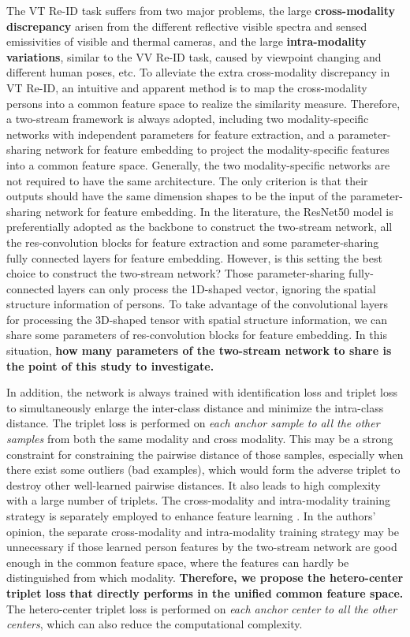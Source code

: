\documentclass[journal]{IEEEtran}
\begin{document}
The VT Re-ID task suffers from two major problems, the large \textbf{cross-modality discrepancy} arisen from the different reflective visible spectra and sensed emissivities of visible and thermal cameras, and the large \textbf{intra-modality variations}, similar to the VV Re-ID task, caused by viewpoint changing and different human poses, etc.
To alleviate the extra cross-modality discrepancy in VT Re-ID, an intuitive and apparent method is to map the cross-modality persons into a common feature space to realize the similarity measure. Therefore, a two-stream framework is always adopted, including two modality-specific networks with independent parameters for feature extraction, and a parameter-sharing network for feature embedding to project the modality-specific features into a common feature space.
Generally, the two modality-specific networks are not required to have the same architecture. The only criterion is that their outputs should have the same dimension shapes to be the input of the parameter-sharing network for feature embedding.
In the literature, the ResNet50 \cite{he2016deep} model is preferentially adopted as the backbone to construct the two-stream network, all the res-convolution blocks for feature extraction and some parameter-sharing fully connected layers for feature embedding. However, is this setting the best choice to construct the two-stream network? Those parameter-sharing fully-connected layers can only process the 1D-shaped vector, ignoring the spatial structure information of persons. To take advantage of the convolutional layers for processing the 3D-shaped tensor with spatial structure information, we can share some parameters of res-convolution blocks for feature embedding. In this situation, \textbf{how many parameters of the two-stream network to share is the point of this study to investigate.}

In addition, the network is always trained with identification loss and triplet loss to simultaneously enlarge the inter-class distance and minimize the intra-class distance.
The triplet loss is performed on \emph{each anchor sample to all the other samples} from both the same modality and cross modality. This may be a strong constraint for constraining the pairwise distance of those samples, especially when there exist some outliers (bad examples), which would form the adverse triplet to destroy other well-learned pairwise distances. It also leads to high complexity with a large number of triplets.
The cross-modality and intra-modality training strategy is separately employed to enhance feature learning \cite{ye2018visible,liu2020enhancing}. In the authors' opinion, the separate cross-modality and intra-modality training strategy may be unnecessary if those learned person features by the two-stream network are good enough in the common feature space, where the features can hardly be distinguished from which modality.
\textbf{Therefore, we propose the hetero-center triplet loss that directly performs in the unified common feature space.} The hetero-center triplet loss is performed on \emph{each anchor center to all the other centers}, which can also reduce the computational complexity.
\end{document}
